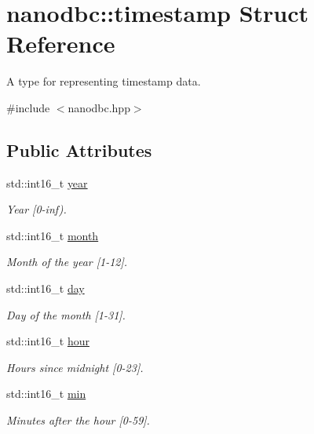 \hypertarget{structnanodbc_1_1timestamp}{}\section{nanodbc\+::timestamp Struct Reference}
\label{structnanodbc_1_1timestamp}


A type for representing timestamp data.  




{\ttfamily \#include $<$nanodbc.\+hpp$>$}

\subsection*{Public Attributes}
\begin{DoxyCompactItemize}
\item 
std\+::int16\+\_\+t \mbox{\hyperlink{structnanodbc_1_1timestamp_a6d1ef94ca614b995aea22d1b82da1270}{year}}
\begin{DoxyCompactList}\small\item\em Year \mbox{[}0-\/inf). \end{DoxyCompactList}\item 
std\+::int16\+\_\+t \mbox{\hyperlink{structnanodbc_1_1timestamp_ae2bd4cf92b2a27aac722cf431406f4e0}{month}}
\begin{DoxyCompactList}\small\item\em Month of the year \mbox{[}1-\/12\mbox{]}. \end{DoxyCompactList}\item 
std\+::int16\+\_\+t \mbox{\hyperlink{structnanodbc_1_1timestamp_a5ca9eb0eb39990449ba3f855e119f487}{day}}
\begin{DoxyCompactList}\small\item\em Day of the month \mbox{[}1-\/31\mbox{]}. \end{DoxyCompactList}\item 
std\+::int16\+\_\+t \mbox{\hyperlink{structnanodbc_1_1timestamp_a07789e9f5f634491786cf8d6ceb4e4a3}{hour}}
\begin{DoxyCompactList}\small\item\em Hours since midnight \mbox{[}0-\/23\mbox{]}. \end{DoxyCompactList}\item 
std\+::int16\+\_\+t \mbox{\hyperlink{structnanodbc_1_1timestamp_a6d43619ba944b287e1db1c41493ba2a3}{min}}
\begin{DoxyCompactList}\small\item\em Minutes after the hour \mbox{[}0-\/59\mbox{]}. \end{DoxyCompactList}\item 

\end{DoxyCompactItemize}
